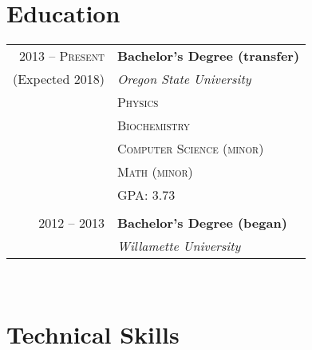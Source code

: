 \documentclass[10pt]{article} %
\begin{document}
{\begin{minipage}[t]{0.44\textwidth}
\section{Education} 

\begin{tabular}{rl} %


2013 -- \textsc{Present} & \textbf{Bachelor's Degree (transfer)} \\
(Expected 2018)& \textit{Oregon State University}\\
& \textsc{Physics}\\
& \textsc{Biochemistry}\\
& \textsc{Computer Science (minor)}\\
& \textsc{Math (minor)}\\
& GPA: 3.73\\ \\

2012 -- 2013 & \textbf{Bachelor's Degree (began)} \\ 
& \textit{Willamette University}\\
	

\end{tabular}\\[10pt]


\section{Technical Skills} 


\end{minipage}}
\end{document}
